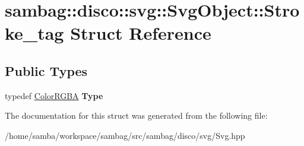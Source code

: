 \hypertarget{structsambag_1_1disco_1_1svg_1_1_svg_object_1_1_stroke__tag}{
\section{sambag::disco::svg::SvgObject::Stroke\_\-tag Struct Reference}
\label{structsambag_1_1disco_1_1svg_1_1_svg_object_1_1_stroke__tag}
}
\subsection*{Public Types}
\begin{DoxyCompactItemize}
\item 
\hypertarget{structsambag_1_1disco_1_1svg_1_1_svg_object_1_1_stroke__tag_ac954a56f9d35f99d8170aff10cde2573}{
typedef \hyperlink{structsambag_1_1com_1_1_color_r_g_b_a}{ColorRGBA} {\bfseries Type}}
\label{structsambag_1_1disco_1_1svg_1_1_svg_object_1_1_stroke__tag_ac954a56f9d35f99d8170aff10cde2573}

\end{DoxyCompactItemize}


The documentation for this struct was generated from the following file:\begin{DoxyCompactItemize}
\item 
/home/samba/workspace/sambag/src/sambag/disco/svg/Svg.hpp\end{DoxyCompactItemize}
